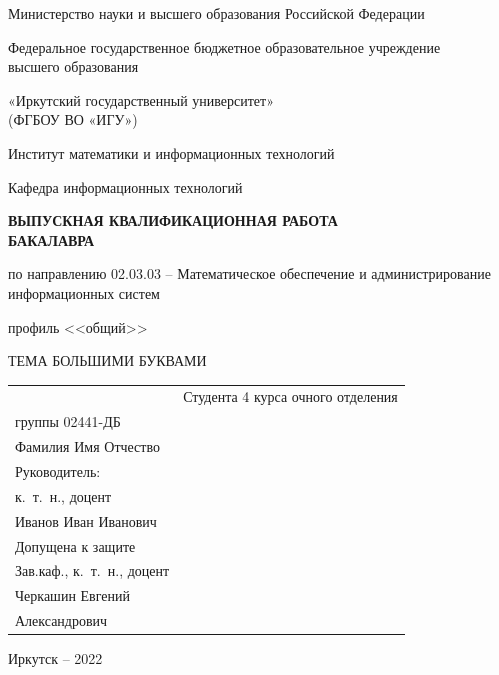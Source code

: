 \documentclass{studrep}
\begin{document}
\thispagestyle{empty}
\begin{center}
Министерство науки и высшего образования Российской Федерации

Федеральное государственное бюджетное образовательное учреждение\\ высшего образования

«Иркутский государственный университет»\\
(ФГБОУ ВО «ИГУ»)

Институт математики и информационных технологий

Кафедра информационных технологий
\end{center}

\vfill
\begin{center}
  \textbf{ ВЫПУСКНАЯ КВАЛИФИКАЦИОННАЯ РАБОТА\\
БАКАЛАВРА}
\vspace{1em}

по направлению 02.03.03 -- Математическое обеспечение и администрирование информационных систем

профиль <<общий>>

\vspace{2em}
ТЕМА БОЛЬШИМИ БУКВАМИ

\end{center}
\vfill

\noindent\begin{tabularx}{\textwidth} {
  >{\raggedright\arraybackslash}X
  >{\raggedright}X }
&

Студента 4 курса очного отделения\\
группы 02441-ДБ\\
Фамилия Имя Отчество\\[2em]

Руководитель:\\
к.~т.~н., доцент\\
\underline{\hspace{3cm}} Иванов Иван Иванович\\[2em]

Допущена к защите\\
Зав.каф., к.~т.~н., доцент\\
\underline{\hspace{3cm}} Черкашин Евгений\\ \hspace{3cm} Александрович\\[2em]

\end{tabularx}
\vfill
\begin{center}
  Иркутск -- 2022
\end{center}
\clearpage
\end{document}
